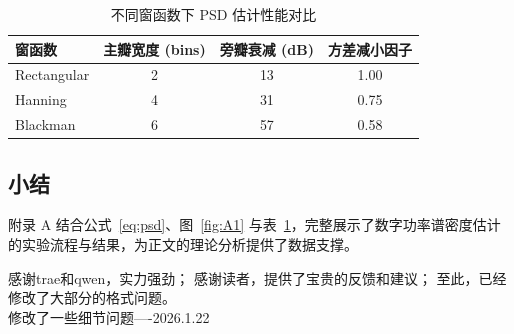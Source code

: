 \documentclass[UTF8,AutoFakeBold=1,AutoFakeSlant,zihao=-4]{SCAU}
\begin{document}
\vspace{1cm}
\begin{table}[h]
  \centering
  \caption{不同窗函数下 PSD 估计性能对比}
  \label{tab:psd-params}
  \begin{tabular}{lccc}
    \toprule
    \textbf{窗函数} & \textbf{主瓣宽度 (bins)} & \textbf{旁瓣衰减 (dB)} & \textbf{方差减小因子} \\
    \midrule
    Rectangular & 2 & 13 & 1.00 \\
    Hanning & 4 & 31 & 0.75 \\
    Blackman & 6 & 57 & 0.58 \\
    \bottomrule
  \end{tabular}
\end{table}

\subsection{小结}
附录 A 结合公式~\eqref{eq:psd}、图~\ref{fig:A1} 与表~\ref{tab:psd-params}，完整展示了数字功率谱密度估计的实验流程与结果，为正文的理论分析提供了数据支撑。


\acknowledgement

感谢trae和qwen，实力强劲；
感谢读者，提供了宝贵的反馈和建议；
至此，已经修改了大部分的格式问题。\\
修改了一些细节问题----2026.1.22
\end{document}
